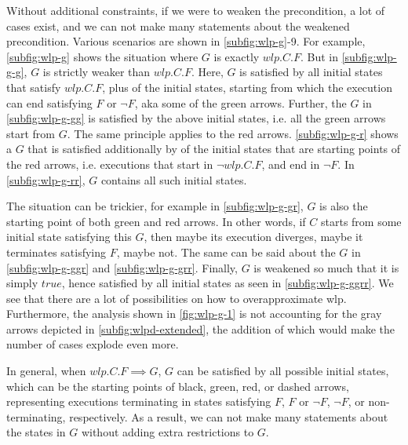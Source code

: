 Without additional constraints, if we were to weaken the precondition, a lot of cases exist, and we can not make many statements about the weakened precondition. 
Various scenarios are shown in \autoref{subfig:wlp-g}{\color{RoyalBlue}-9}. 
For example, \autoref{subfig:wlp-g} shows the situation where $G$ is exactly $wlp.C.F$. 
But in \autoref{subfig:wlp-g-g}, $G$ is strictly weaker than $wlp.C.F$. 
Here, $G$ is satisfied by all initial states that satisfy $wlp.C.F$, plus  of the initial states, starting from which the execution can end satisfying $F$ or $\neg F$, aka some of the green arrows. 
Further, the $G$ in \autoref{subfig:wlp-g-gg} is satisfied by  the above initial states, i.e. all the green arrows start from $G$. 
The same principle applies to the red arrows. 
\autoref{subfig:wlp-g-r} shows a $G$ that is satisfied additionally by  of the initial states that are starting points of the red arrows, i.e. executions that start in $\neg wlp.C.F$, and end in $\neg F$. 
In \autoref{subfig:wlp-g-rr}, $G$ contains all such initial states. 

The situation can be trickier, for example in \autoref{subfig:wlp-g-gr}, $G$ is also the starting point of both green and red arrows. 
In other words, if $C$ starts from some initial state satisfying this $G$, then maybe its execution diverges, maybe it terminates satisfying $F$, maybe not. 
The same can be said about the $G$ in \autoref{subfig:wlp-g-ggr} and \autoref{subfig:wlp-g-grr}. 
Finally, $G$ is weakened so much that it is simply $true$, hence satisfied by all initial states as seen in \autoref{subfig:wlp-g-ggrr}. 
We see that there are a lot of possibilities on how to overapproximate wlp. 
Furthermore, the analysis shown in \autoref{fig:wlp-g-1} is not accounting for the gray arrows depicted in \autoref{subfig:wlpd-extended}, the addition of which would make the number of cases explode even more. 


In general, when $wlp.C.F\implies G$, $G$ can be satisfied by all possible initial states, which can be the starting points of black, green, red, or dashed arrows, representing executions terminating in states satisfying $F$, $F$ or $\neg F$, $\neg F$, or non-terminating, respectively. 
As a result, we can not make many statements about the states in $G$ without adding extra restrictions to $G$. 

